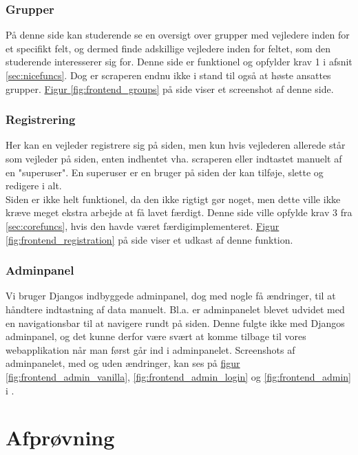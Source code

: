 \documentclass[12pt]{article}
\begin{document}
\subsubsection{Grupper}
På denne side kan studerende se en oversigt over grupper med vejledere inden for et specifikt felt, og dermed finde adskillige vejledere inden for feltet, som den studerende interesserer sig for.
Denne side er funktionel og opfylder krav 1 i afsnit \ref{sec:nicefuncs}. Dog er scraperen endnu ikke i stand til også at høste ansattes grupper. \hyperref[fig:frontend_groups]{Figur \ref*{fig:frontend_groups}} på side \pageref{fig:frontend_groups} viser et screenshot af denne side.

\subsubsection{Registrering}
Her kan en vejleder registrere sig på siden, men kun hvis vejlederen allerede står som vejleder på siden, enten indhentet vha. scraperen eller indtastet manuelt af en "superuser". En superuser er en bruger på siden der kan tilføje, slette og redigere i alt.\\
Siden er ikke helt funktionel, da den ikke rigtigt gør noget, men dette ville ikke kræve meget ekstra arbejde at få lavet færdigt.
Denne side ville opfylde krav 3 fra \ref{sec:corefuncs}, hvis den havde været færdigimplementeret. \hyperref[fig:frontend_registration]{Figur \ref*{fig:frontend_registration}} på side \pageref{fig:frontend_registration} viser et udkast af denne funktion.

\subsubsection{Adminpanel}
Vi bruger Djangos indbyggede adminpanel, dog med nogle få ændringer, til at håndtere indtastning af data manuelt. Bl.a. er adminpanelet blevet udvidet med en navigationsbar til at navigere rundt på siden. Denne fulgte ikke med Djangos adminpanel, og det kunne derfor være svært at komme tilbage til vores webapplikation når man først går ind i adminpanelet. Screenshots af adminpanelet, med og uden ændringer, kan ses på \hyperref[fig:frontend_admin_vanilla]{figur \ref*{fig:frontend_admin_vanilla}}, \ref{fig:frontend_admin_login} og \ref{fig:frontend_admin} i .

\section{Afprøvning}
\label{sec:afproevning}
\end{document}
